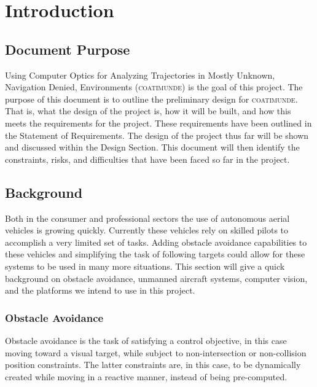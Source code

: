 \documentclass{article}
\begin{document}


\tableofcontents

\newpage

\section{Introduction}

	\subsection{Document Purpose}
	
	Using Computer Optics for Analyzing Trajectories in Mostly Unknown, Navigation Denied, Environments (\textsc{coatimunde}) is the goal of this project. The purpose of this document is to outline the preliminary design for \textsc{coatimunde}. That is, what the design of the project is, how it will be built, and how this meets the requirements for the project. These requirements have been outlined in the Statement of Requirements. The design of the project thus far will be shown and discussed within the Design Section. This document will then identify the constraints, risks, and difficulties that have been faced so far in the project.
	
	\subsection{Background}
	
	Both in the consumer and professional sectors the use of autonomous aerial vehicles is growing quickly. Currently these vehicles rely on skilled pilots to accomplish a very limited set of tasks. Adding obstacle avoidance capabilities to these vehicles and simplifying the task of following targets could allow for these systems to be used in many more situations. This section will give a quick background on obstacle avoidance, unmanned aircraft systems, computer vision, and the platforms we intend to use in this project.
	
		\subsubsection{Obstacle Avoidance}
		
		
		Obstacle avoidance is the task of satisfying a control objective, in this case moving toward a visual target, while subject to non-intersection or non-collision position constraints. The latter constraints are, in this case, to be dynamically created while moving in a reactive manner, instead of being pre-computed.
		
\end{document}
